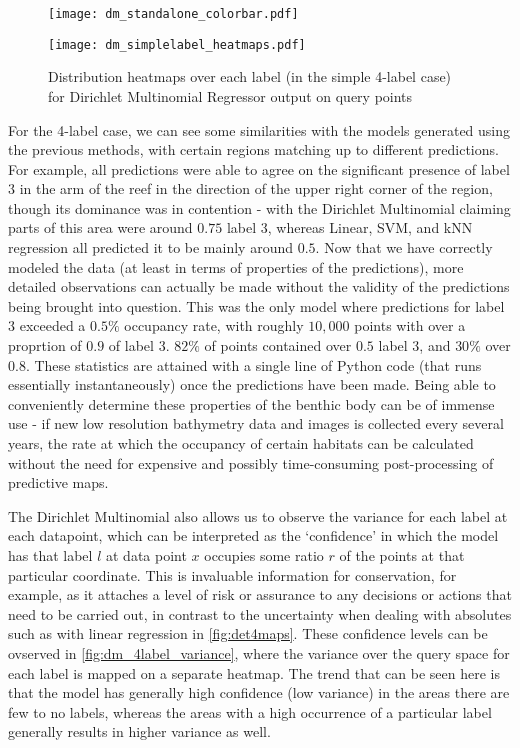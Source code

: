\begin{figure}[H]
    \begin{minipage}{\linewidth}
        \centerline{\texttt{[image: dm\_standalone\_colorbar.pdf]}}
        \centerline{\texttt{[image: dm\_simplelabel\_heatmaps.pdf]}}
        \caption{Distribution heatmaps over each label (in the simple 4-label case) for Dirichlet Multinomial Regressor output on query points}
        \label{fig:dm_4label_heatmap}
    \end{minipage}
    \hfill
\end{figure}

For the 4-label case, we can see some similarities with the models generated using the previous methods, with certain regions matching up to different predictions. For example, all predictions were able to agree on the significant presence of label $3$ in the arm of the reef in the direction of the upper right corner of the region, though its dominance was in contention - with the Dirichlet Multinomial claiming parts of this area were around $0.75$ label 3, whereas Linear, SVM, and kNN regression all predicted it to be mainly around $0.5$. Now that we have correctly modeled the data (at least in terms of properties of the predictions), more detailed observations can actually be made without the validity of the predictions being brought into question. This was the only model where predictions for label 3 exceeded a $0.5\%$ occupancy rate, with roughly $10,000$ points with over a proprtion of $0.9$ of label 3. $82\%$ of points contained over $0.5$ label 3, and $30\%$ over $0.8$. These statistics are attained with a single line of Python code (that runs essentially instantaneously) once the predictions have been made. Being able to conveniently determine these properties of the benthic body can be of immense use - if new low resolution bathymetry data and images is collected every several years, the rate at which the occupancy of certain habitats can be calculated without the need for expensive and possibly time-consuming post-processing of predictive maps.

The Dirichlet Multinomial also allows us to observe the variance for each label at each datapoint, which can be interpreted as the `confidence' in which the model has that label $l$ at data point $x$ occupies some ratio $r$ of the points at that particular coordinate. This is invaluable information for conservation, for example, as it attaches a level of risk or assurance to any decisions or actions that need to be carried out, in contrast to the uncertainty when dealing with absolutes such as with linear regression in \autoref{fig:det4maps}. These confidence levels can be ovserved in \autoref{fig:dm_4label_variance}, where the variance over the query space for each label is mapped on a separate heatmap. The trend that can be seen here is that the model has generally high confidence (low variance) in the areas there are few to no labels, whereas the areas with a high occurrence of a particular label generally results in higher variance as well.

